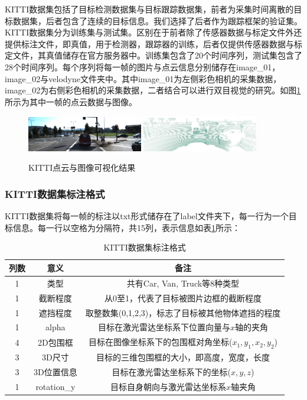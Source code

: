 KITTI数据集包括了目标检测数据集与目标跟踪数据集，前者为采集时间离散的目标数据集，后者包含了连续的目标信息。我们选择了后者作为跟踪框架的验证集。KITTI数据集分为训练集与测试集。区别在于前者除了传感器数据与标定文件外还提供标注文件，即真值，用于检测器，跟踪器的训练，后者仅提供传感器数据与标定文件，其真值储存在官方服务器中。训练集包含了20个时间序列，测试集包含了28个时间序列。每个序列将每一帧的图片与点云信息分别储存在image\_01，image\_02与velodyne文件夹中。其中image\_01为左侧彩色相机的采集数据，image\_02为右侧彩色相机的采集数据，二者结合可以进行双目视觉的研究。如图\ref{fig15}所示为其中一帧的点云数据与图像。

\begin{figure}[htb] 
    \center
    \includegraphics[width=0.45\textwidth]{figure/fig15.png}
    \includegraphics[width=0.45\textwidth]{figure/fig16.png}
    \caption{KITTI点云与图像可视化结果}
    \label{fig15}
\end{figure}

\subsubsection{KITTI数据集标注格式}

KITTI数据集将每一帧的标注以txt形式储存在了label文件夹下，每一行为一个目标信息。每一行以空格为分隔符，共15列，表示信息如表\ref{table2}所示：

\begin{table}[htbp]
    \centering
    \caption{KITTI数据集标注格式}
    \begin{tabular}{c c c}
    \toprule
    列数 & 意义 & 备注 \\
    \midrule
    1 & 类型 & 共有Car, Van, Truck等8种类型\\
    1 & 截断程度 & 从0至1，代表了目标被图片边框的截断程度\\
    1 & 遮挡程度 & 取整数集(0,1,2,3)，标志了目标被其他物体遮挡的程度\\
    1 & alpha & 目标在激光雷达坐标系下位置向量与$x$轴的夹角\\
    4 & 2D包围框 & 目标在图像坐标系下的包围框对角坐标($x_1, y_1, x_2, y_2$)\\
    3 & 3D尺寸 & 目标的三维包围框的大小，即高度，宽度，长度\\
    3 & 3D位置信息 & 目标在激光雷达坐标系下的坐标($x,y,z$)\\
    1 & rotation\_y & 目标自身朝向与激光雷达坐标系$x$轴夹角\\
    \bottomrule
    \end{tabular}
    \label{table2}
\end{table}

